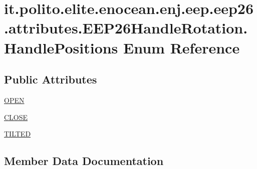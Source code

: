 \hypertarget{enumit_1_1polito_1_1elite_1_1enocean_1_1enj_1_1eep_1_1eep26_1_1attributes_1_1_e_e_p26_handle_rotation_1_1_handle_positions}{}\section{it.\+polito.\+elite.\+enocean.\+enj.\+eep.\+eep26.\+attributes.\+E\+E\+P26\+Handle\+Rotation.\+Handle\+Positions Enum Reference}
\label{enumit_1_1polito_1_1elite_1_1enocean_1_1enj_1_1eep_1_1eep26_1_1attributes_1_1_e_e_p26_handle_rotation_1_1_handle_positions}
\subsection*{Public Attributes}
\begin{DoxyCompactItemize}
\item 
\hyperlink{enumit_1_1polito_1_1elite_1_1enocean_1_1enj_1_1eep_1_1eep26_1_1attributes_1_1_e_e_p26_handle_rotation_1_1_handle_positions_a8595aeda4861017fbb4536ec5b08de8c}{O\+P\+EN}
\item 
\hyperlink{enumit_1_1polito_1_1elite_1_1enocean_1_1enj_1_1eep_1_1eep26_1_1attributes_1_1_e_e_p26_handle_rotation_1_1_handle_positions_a144b0902a3e680792b954c87c331edbc}{C\+L\+O\+SE}
\item 
\hyperlink{enumit_1_1polito_1_1elite_1_1enocean_1_1enj_1_1eep_1_1eep26_1_1attributes_1_1_e_e_p26_handle_rotation_1_1_handle_positions_aca341add3c2c0b4e437daa7503cd2a96}{T\+I\+L\+T\+ED}
\end{DoxyCompactItemize}


\subsection{Member Data Documentation}
\hypertarget{enumit_1_1polito_1_1elite_1_1enocean_1_1enj_1_1eep_1_1eep26_1_1attributes_1_1_e_e_p26_handle_rotation_1_1_handle_positions_a144b0902a3e680792b954c87c331edbc}{}\label{enumit_1_1polito_1_1elite_1_1enocean_1_1enj_1_1eep_1_1eep26_1_1attributes_1_1_e_e_p26_handle_rotation_1_1_handle_positions_a144b0902a3e680792b954c87c331edbc} 
